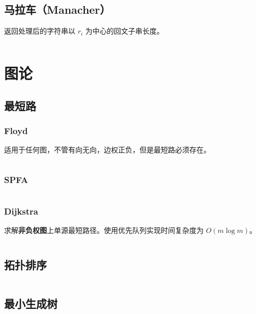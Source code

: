 \documentclass[a4paper, twoside]{article}
\begin{document}
\subsection{马拉车（Manacher）}
返回处理后的字符串以 $r_i$ 为中心的回文子串长度。
\inputminted{cpp}{../src/字符串/Manacher.cpp}


\newpage
\section{图论}
\subsection{最短路}
    \subsubsection{Floyd}
    适用于任何图，不管有向无向，边权正负，但是最短路必须存在。
    \inputminted{cpp}{../src/图论/Floyd.cpp}

    \subsubsection{SPFA}
    \inputminted{cpp}{../src/图论/SPFA.cpp}

    \subsubsection{Dijkstra}
    求解\textbf{非负权图}上单源最短路径。使用优先队列实现时间复杂度为 $O(m \log m)$。
    \inputminted{cpp}{../src/图论/Dijkstra.cpp}


\subsection{拓扑排序}
    \inputminted{cpp}{../src/图论/拓扑排序.cpp}

\subsection{最小生成树}
\end{document}
